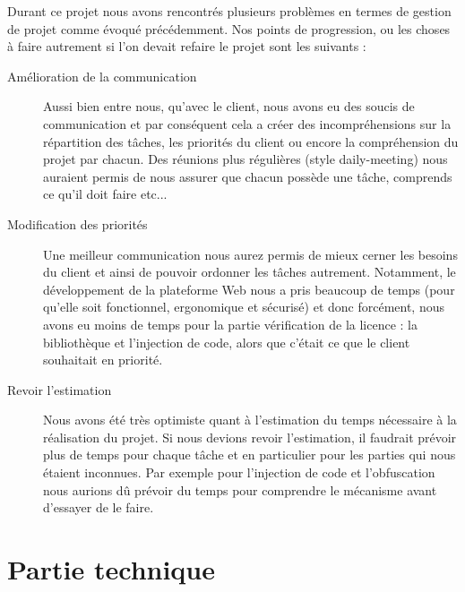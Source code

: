 Durant ce projet nous avons rencontrés plusieurs problèmes en termes de gestion de projet comme évoqué précédemment.
Nos points de progression, ou les choses à faire autrement si l'on devait refaire le projet sont les suivants :
\begin{description}
    \item[Amélioration de la communication]
        Aussi bien entre nous, qu'avec le client, nous avons eu des soucis de communication et par conséquent cela
        a créer des incompréhensions sur la répartition des tâches, les priorités du client ou encore la compréhension
        du projet par chacun. Des réunions plus régulières (style daily-meeting) nous auraient permis de nous assurer
        que chacun possède une tâche, comprends ce qu'il doit faire etc...
    \item[Modification des priorités]
        Une meilleur communication nous aurez permis de mieux cerner les besoins du client et ainsi de pouvoir ordonner
        les tâches autrement. Notamment, le développement de la plateforme Web nous a pris beaucoup de temps (pour qu'elle
        soit fonctionnel, ergonomique et sécurisé) et donc forcément, nous avons eu moins de temps pour la partie vérification
        de la licence : la bibliothèque et l'injection de code, alors que c'était ce que le client souhaitait en priorité.
    \item[Revoir l'estimation]
        Nous avons été très optimiste quant à l'estimation du temps nécessaire à la réalisation du projet. Si nous devions
        revoir l'estimation, il faudrait prévoir plus de temps pour chaque tâche et en particulier pour les parties qui 
        nous étaient inconnues. Par exemple pour l'injection de code et l'obfuscation nous aurions dû prévoir du temps
        pour comprendre le mécanisme avant d'essayer de le faire.
\end{description}

\section{Partie technique}


